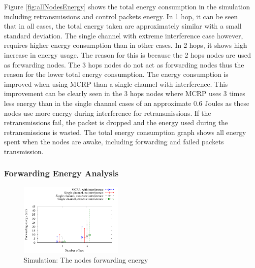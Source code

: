 Figure \ref{fig:allNodesEnergy} shows the total energy consumption in the simulation including retransmissions and control packets energy.  
In 1 hop, it can be seen that in all cases, the total energy taken are approximately similar with a small standard deviation. The single channel with extreme interference case however, requires higher energy consumption than in other cases.
In 2 hops, it shows high increase in energy usage. The reason for this is because the 2 hops nodes are used as forwarding nodes. The 3 hops nodes do not act as forwarding nodes thus the reason for the lower total energy consumption.
The energy consumption is improved when using MCRP than a single channel with interference. This improvement can be clearly seen in the 3 hops nodes where MCRP uses 3 times less energy than in the single channel cases of an approximate 0.6 Joules as these nodes use more energy during interference for retransmissions. If the retransmissions fail, the packet is dropped and the energy used during the retransmissions is wasted. The total energy consumption graph shows all energy spent when the nodes are awake, including forwarding and failed packets transmission.

\subsubsection{Forwarding Energy Analysis}

\begin{figure}
\centering
\includegraphics[width=0.45\textwidth]{figures/fwdEnergy.pdf}
\caption{Simulation: The nodes forwarding energy}
\label{fig:allNodesFwdEnergy}
\end{figure}

